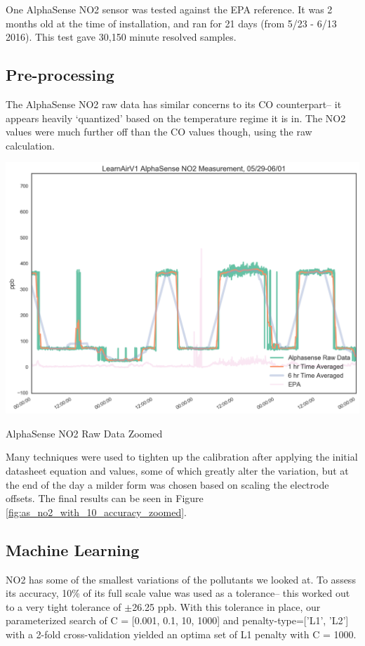 One AlphaSense NO2 sensor was tested against the EPA reference.  It was 2 months old at the time of installation, and ran for 21 days (from 5/23 - 6/13 2016).  This test gave 30,150 minute resolved samples.


\subsection{Pre-processing}

The AlphaSense NO2 raw data has similar concerns to its CO counterpart-- it appears heavily `quantized' based on the temperature regime it is in.  The NO2 values were much further off than the CO values though, using the raw calculation.  

\begin{marginfigure}
 	\includegraphics[width=\textwidth]{figs/as_no2_raw_zoomed}               
 	 \caption{AlphaSense NO2 Raw Data Zoomed}
  	\label{fig:as_no2_raw_zoomed}
\end{marginfigure}

Many techniques were used to tighten up the calibration after applying the initial datasheet equation and values, some of which greatly alter the variation, but at the end of the day a milder form was chosen based on scaling the electrode offsets.  The final results can be seen in Figure \ref{fig:as_no2_with_10_accuracy_zoomed}.  

\subsection{Machine Learning}

NO2 has some of the smallest variations of the pollutants we looked at.  To assess its accuracy, 10\% of its full scale value was used as a tolerance-- this worked out to a very tight tolerance of $\pm$26.25 ppb.  With this tolerance in place, our parameterized search of C = [0.001, 0.1, 10, 1000] and penalty-type=['L1', 'L2'] with a 2-fold cross-validation yielded an optima set of L1 penalty with C = 1000.    

